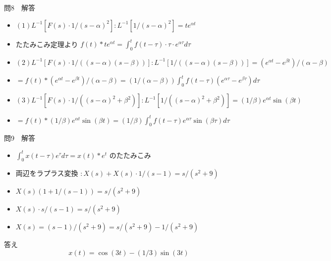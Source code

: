 \documentclass[aspectratio=43,professionalfonts,handout]{beamer}
\begin{document}
\begin{frame}{問8　解答}
  \begin{block}{}
  \begin{itemize}\setlength{\itemsep}{2pt}
    \item $(1) L^{-1}[F(s)\cdot1/(s-\alpha)^{2}]:  L^{-1}[1/(s-\alpha)^{2}] = te^{\alpha t}$
    \item たたみこみ定理より $f(t)*te^{\alpha t} = \int_{0}^t f(t-\tau)\cdot\tau\cdot e^{\alpha\tau}d\tau$
    \item $(2) L^{-1}[F(s)\cdot1/((s-\alpha)(s-\beta))]:  L^{-1}[1/((s-\alpha)(s-\beta))] = (e^{\alpha t}-e^{\beta t})/(\alpha-\beta)$
    \item $    = f(t)*(e^{\alpha t}-e^{\beta t})/(\alpha-\beta) = (1/(\alpha-\beta))\int_{0}^t f(t-\tau)(e^{\alpha\tau}-e^{\beta\tau})d\tau$
    \item $(3) L^{-1}[F(s)\cdot1/((s-\alpha)^{2}+\beta^{2})]:  L^{-1}[1/((s-\alpha)^{2}+\beta^{2})] = (1/\beta)e^{\alpha t}\sin(\beta t)$
    \item $    = f(t)*(1/\beta)e^{\alpha t}\sin(\beta t) = (1/\beta)\int_{0}^t f(t-\tau)e^{\alpha\tau}\sin(\beta\tau)d\tau$
  \end{itemize}
  \end{block}
\end{frame}

\begin{frame}{問9　解答}
  \begin{block}{}
  \begin{itemize}\setlength{\itemsep}{2pt}
    \item $\int_{0}^t x(t-\tau)e^\tau d\tau = x(t)*e^t$ のたたみこみ
    \item 両辺をラプラス変換 $: X(s) + X(s)\cdot1/(s-1) = s/(s^{2}+9)$
    \item $X(s)(1 + 1/(s-1)) = s/(s^{2}+9)$
    \item $X(s)\cdot s/(s-1) = s/(s^{2}+9)$
    \item $X(s) = (s-1)/(s^{2}+9) = s/(s^{2}+9) - 1/(s^{2}+9)$
  \end{itemize}
  \end{block}
  \begin{exampleblock}{答え}
    \[
    x(t) = \cos(3t) - (1/3)\sin(3t)
  \]
  \end{exampleblock}
\end{frame}
\end{document}
